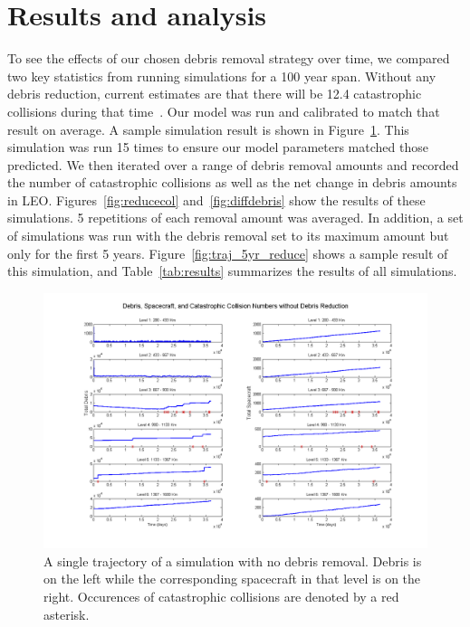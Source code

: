 \documentclass[pre,12pt]{revtex4-1}
\begin{document}
\section{Results and analysis}\label{Results}

To see the effects of our chosen debris removal strategy over time, we compared two key statistics from running simulations for a 100 year span. Without any debris reduction, current estimates are that there will be 12.4 catastrophic collisions during that time~\cite{CollisionProbs}. Our model was run and calibrated to match that result on average. A sample simulation result is shown in Figure~\ref{fig:traj_no_reduce}. This simulation was run 15 times to ensure our model parameters matched those predicted. We then iterated over a range of debris removal amounts and recorded the number of catastrophic collisions as well as the net change in debris amounts in LEO. Figures~\ref{fig:reducecol} and~\ref{fig:diffdebris} show the results of these simulations. 5 repetitions of each removal amount was averaged. In addition, a set of simulations was run with the debris removal set to its maximum amount but only for the first 5 years. Figure~\ref{fig:traj_5yr_reduce} shows a sample result of this simulation, and Table~\ref{tab:results} summarizes the results of all simulations.

\begin{figure}
	\hspace*{-40pt}
	\includegraphics[width=1.2\linewidth]{"Figures/traj_no_reduce"}
	\caption{A single trajectory of a simulation with no debris removal. Debris is on the left while the corresponding spacecraft in that level is on the right. Occurences of catastrophic collisions are denoted by a red asterisk.}
	\label{fig:traj_no_reduce}
\end{figure}
\end{document}
